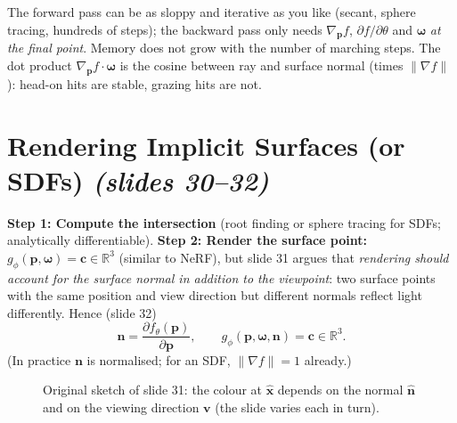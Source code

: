 \documentclass[11pt,a4paper]{article}
\newcommand{\R}{\mathbb{R}}
\newcommand{\bx}{{\bm{x}}}
\newcommand{\bp}{{\bm{p}}}
\newcommand{\bn}{{\bm{n}}}
\newcommand{\bc}{{\bm{c}}}
\newcommand{\bom}{{\bm{\omega}}}
\newcommand{\pdv}[2]{\frac{\partial #1}{\partial #2}}
\begin{document}
\begin{intuition}
The forward pass can be as sloppy and iterative as you like (secant, sphere tracing, hundreds of steps); the backward
pass only needs $\nabla_{\bp} f$, $\partial f/\partial\theta$ and $\bom$ \emph{at the final point}. Memory does not grow with the number of marching steps.
The dot product $\nabla_{\bp} f\cdot\bom$ is the cosine between ray and surface normal (times $\|\nabla f\|$): head-on hits are
stable, grazing hits are not.
\end{intuition}

\section{Rendering Implicit Surfaces (or SDFs) \emph{(slides 30--32)}}
\textbf{Step 1: Compute the intersection} (root finding or sphere tracing for SDFs; analytically differentiable).
\textbf{Step 2: Render the surface point:}
$g_\phi(\bp,\bom)=\bc\in\R^3$ (similar to NeRF), but slide 31 argues that \emph{rendering should account for the surface
normal in addition to the viewpoint}: two surface points with the same position and view direction but different normals
reflect light differently. Hence (slide 32)
\[
\bn=\pdv{f_\theta(\bp)}{\bp},\qquad g_\phi(\bp,\bom,\bn)=\bc\in\R^3 .
\]
(In practice $\bn$ is normalised; for an SDF, $\|\nabla f\|=1$ already.)

\begin{figure}[htbp]
\centering
{}
\caption{Original sketch of slide 31: the colour at $\hat\bx$ depends on the normal $\hat\bn$ and on the viewing direction $\bm v$ (the slide varies each in turn).}
\end{figure}
\end{document}
